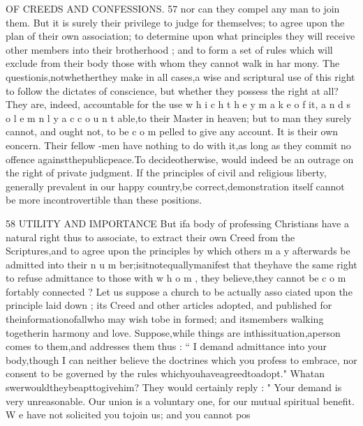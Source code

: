 \documentclass[
]{book}
\begin{document}
OF CREEDS AND CONFESSIONS. 57
nor can they compel any man to join them. But it is surely their privilege to judge for themselves; to agree upon the plan of their own association; to determine upon what
principles they will receive other members into their brotherhood ; and to form a set of rules which will exclude from their body those with whom they cannot walk in har mony. The questionis,notwhetherthey make in all cases,a wise and scriptural use of this right to follow the dictates of conscience, but whether they possess the right at all? They are, indeed, accountable for the use w h i c h t h e y m a k e o f it, a n d s o l e m n l y a c c o u n t able,to their Master in heaven; but to man they surely cannot, and ought not, to be c o m
pelled to give any account. It is their own
eoncern. Their fellow -men have nothing to do with it,as long as they commit no offence
againstthepublicpeace.To decideotherwise, would indeed be an outrage on the right of private judgment. If the principles of civil
and religious liberty, generally prevalent in our happy country,be correct,demonstration itself cannot be more incontrovertible than
these positions.

58 UTILITY AND IMPORTANCE
But ifa body of professing Christians have
a natural right thus to associate, to extract
their own Creed from the Scriptures,and to agree upon the principles by which others
m a y afterwards be admitted into their n u m ber;isitnotequallymanifest that theyhave the same right to refuse admittance to those with w h o m , they believe,they cannot be c o m fortably connected ?
Let us suppose a church to be actually asso ciated upon the principle laid down ; its Creed and other articles adopted, and published for theinformationofallwho may wish tobe in formed; and itsmembers walking togetherin harmony and love. Suppose,while things are inthissituation,aperson comes to them,and
addresses them thus : `` I demand admittance
into your body,though I can neither believe
the doctrines which you profess to embrace,
nor consent to be governed by the rules
whichyouhaveagreedtoadopt." Whatan
swerwouldtheybeapttogivehim? They
would certainly reply : " Your demand is very unreasonable. Our union is a voluntary one,
for our mutual spiritual benefit. W e have not solicited you tojoin us; and you cannot pos
\end{document}
